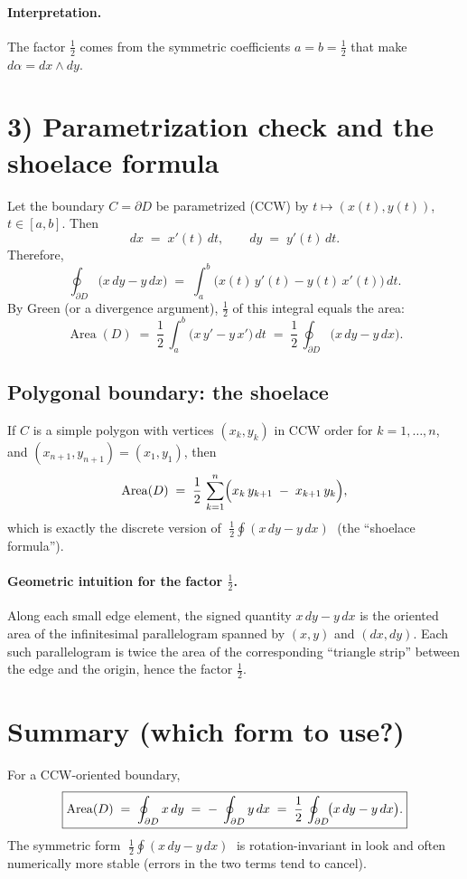 \documentclass[11pt]{article}
\begin{document}
\paragraph{Interpretation.}
The factor \(\tfrac12\) comes from the symmetric coefficients \(a=b=\tfrac12\) that make
\(d\alpha = dx\wedge dy\).

\section*{3) Parametrization check and the shoelace formula}

Let the boundary \(C=\partial D\) be parametrized (CCW) by \(t\mapsto (x(t),y(t))\), \(t\in[a,b]\).
Then
\[
dx \;=\; x'(t)\,dt,
\qquad
dy \;=\; y'(t)\,dt.
\]
Therefore,
\[
\oint_{\partial D}\!\bigl(x\,dy - y\,dx\bigr)
\;=\;
\int_{a}^{b}\!\bigl(x(t)\,y'(t) - y(t)\,x'(t)\bigr)\,dt.
\]
By Green (or a divergence argument), \(\tfrac12\) of this integral equals the area:
\[
\operatorname{Area}(D)
\;=\;
\frac12\,\int_{a}^{b}\!\bigl(x\,y' - y\,x'\bigr)\,dt
\;=\;
\frac12\,\oint_{\partial D}\!\bigl(x\,dy - y\,dx\bigr).
\]

\subsection*{Polygonal boundary: the shoelace}
If \(C\) is a simple polygon with vertices \((x_k,y_k)\) in CCW order for \(k=1,\dots,n\), and
\((x_{n+1},y_{n+1})=(x_1,y_1)\), then
\[
\operatorname{Area}(D)
\;=\;
\frac12\,\sum_{k=1}^{n}
\Bigl(
x_k\,y_{k+1} \;-\; x_{k+1}\,y_k
\Bigr),
\]
which is exactly the discrete version of
\(\;\tfrac12\oint (x\,dy-y\,dx)\;\) (the ``shoelace formula'').

\paragraph{Geometric intuition for the factor \(\tfrac12\).}
Along each small edge element, the signed quantity \(x\,dy - y\,dx\) is the oriented area
of the infinitesimal parallelogram spanned by \((x,y)\) and \((dx,dy)\).
Each such parallelogram is twice the area of the corresponding ``triangle strip''
between the edge and the origin, hence the factor \(\tfrac12\).

\section*{Summary (which form to use?)}
For a CCW-oriented boundary,
\[
\boxed{%
	\operatorname{Area}(D)
	\;=\;
	\oint_{\partial D} x\,dy
	\;=\;
	-\;\oint_{\partial D} y\,dx
	\;=\;
	\frac12\,\oint_{\partial D}\!\bigl(x\,dy - y\,dx\bigr).
}
\]
The symmetric form \(\;\tfrac12\oint(x\,dy - y\,dx)\;\) is rotation-invariant in look and
often numerically more stable (errors in the two terms tend to cancel).
	
\end{document}
